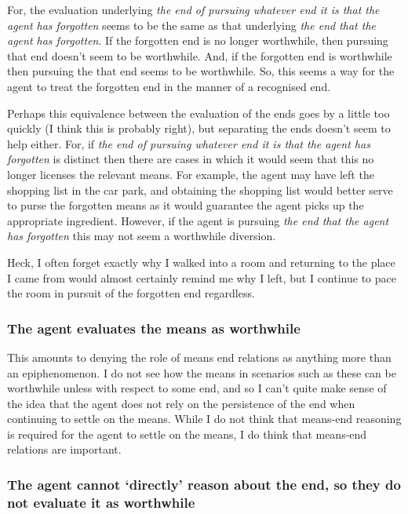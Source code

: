 \documentclass[10pt]{article}
\newcommand{\hozlinedash}[0]{%
  \noindent\hdashrule[0.5ex][c]{\textwidth}{.1pt}{2.5pt}
}
\begin{document}
For, the evaluation underlying \emph{the end of pursuing whatever end it is that the agent has forgotten} seems to be the same as that underlying \emph{the end that the agent has forgotten}.
If the forgotten end is no longer worthwhile, then pursuing that end doesn't seem to be worthwhile.
And, if the forgotten end is worthwhile then pursuing the that end seems to be worthwhile.
So, this seems a way for the agent to treat the forgotten end in the manner of a recognised end.

Perhaps this equivalence between the evaluation of the ends goes by a little too quickly (I think this is probably right), but separating the ends doesn't seem to help either.
For, if \emph{the end of pursuing whatever end it is that the agent has forgotten} is distinct then there are cases in which it would seem that this no longer licenses the relevant means.
For example, the agent may have left the shopping list in the car park, and obtaining the shopping list would better serve to purse the forgotten means as it would guarantee the agent picks up the appropriate ingredient.
However, if the agent is pursuing \emph{the end that the agent has forgotten} this may not seem a worthwhile diversion.

Heck, I often forget exactly why I walked into a room and returning to the place I came from would almost certainly remind me why I left, but I continue to pace the room in pursuit of the forgotten end regardless.

\hozlinedash

\newpage

\subsubsection*{The agent evaluates the means as worthwhile}
\label{sec:agent-eval-means}

This amounts to denying the role of means end relations as anything more than an epiphenomenon.
I do not see how the means in scenarios such as these can be worthwhile unless with respect to some end, and so I can't quite make sense of the idea that the agent does not rely on the persistence of the end when continuing to settle on the means.
While I do not think that means-end reasoning is required for the agent to settle on the means, I do think that means-end relations are important.

\hozlinedash

\subsubsection*{The agent cannot `directly' reason about the end, so they do not evaluate it as worthwhile}
\label{sec:agent-cannot-reason}
\end{document}
